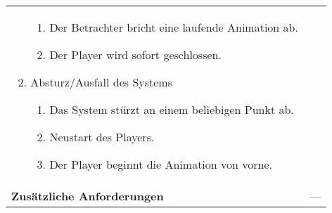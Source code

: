 \begin{longtabu}{p{0.3\textwidth}p{0.7\textwidth}}
\begin{enumerate}[label= (\alph*)]
{                \begin{enumerate}[label= (\roman*)]
                        \item{Der Betrachter bricht eine laufende Animation
                                ab.}
                        \item{Der Player wird sofort geschlossen.}
                \end{enumerate}
            }
            \item{Absturz/Ausfall des Systems
                \begin{enumerate}[label= (\roman*)]
                        \item{Das System stürzt an einem beliebigen Punkt
                                ab.}
                        \item{Neustart des Players.}
                        \item{Der Player beginnt die Animation von vorne.}
                \end{enumerate}
            }
        \end{enumerate}
        \\
    \cmidrule(r){1-1}\cmidrule(lr){2-2}
        \textbf{Zusätzliche Anforderungen} &
        ---\\
    \bottomrule
\end{longtabu}
